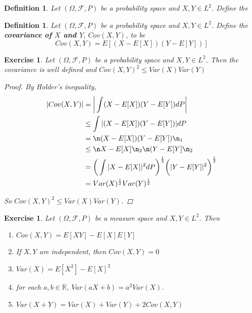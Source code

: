 \documentclass[12pt]{amsart}
\newtheorem{defn}[thm]{Definition}
\newtheorem{ex}[thm]{Exercise}
\newcommand{\Om}{\Omega}
\newcommand{\R}{\mathbb{R}}
\newcommand{\MF}{\mathcal{F}}
\begin{document}
\begin{defn}
	Let $(\Om, \MF, P)$ be a probability space and $X,Y \in L^2$. Define the  
\end{defn}


\begin{defn}
	Let $(\Om, \MF, P)$ be a probability space and $X,Y \in L^2$. Define the \textbf{covariance of $X$ and $Y$}, $Cov(X,Y)$, to be $$Cov(X,Y) = E[(X-E[X])(Y-E[Y])]$$
\end{defn}

\begin{ex}
	Let $(\Om, \MF, P)$ be a probability space and $X,Y \in L^2$. Then the covariance is well defined and $Cov(X,Y) ^2 \leq Var(X)Var(Y)$
	
	\begin{proof}
		By Holder's inequality, 
		\begin{align*}
			\vert Cov(X,Y) \vert 
			&= \bigg \vert \int (X-E[X])(Y-E[Y]) dP \bigg \vert \\
			&\leq \int \vert (X-E[X])(Y-E[Y]) \vert dP \\
			&= \n (X-E[X])(Y-E[Y]) \n_1 \\
			&\leq \n X-E[X] \n_2 \n (Y-E[Y] \n_2  \\
			&= \bigg(\int \vert X - E[X] \vert^2 dP\bigg)^{\frac{1}{2}} \bigg( \vert Y - E[Y] \vert^2 \bigg)^{\frac{1}{2}} \\
			&= Var(X)^{\frac{1}{2}}Var(Y)^{\frac{1}{2}}
		\end{align*}
		
		So $Cov(X,Y) ^2 \leq Var(X)Var(Y)$.
	\end{proof}
	
\end{ex}

\begin{ex}
	Let $(\Om, \MF, P)$ be a measure space and $X,Y \in L^2$. Then
	\begin{enumerate}
		\item $Cov(X,Y) = E[XY]-E[X]E[Y]$
		\item If $X,Y$ are independent, then $Cov(X,Y) = 0$
		\item $Var(X) = E[X^2] - E[X]^2$
		\item for each $a,b \in \R$, $Var(aX + b) = a^2Var(X)$.
		\item $Var(X+Y) = Var(X) + Var(Y) + 2 Cov(X,Y)$
	\end{enumerate}
\end{ex}
\end{document}
